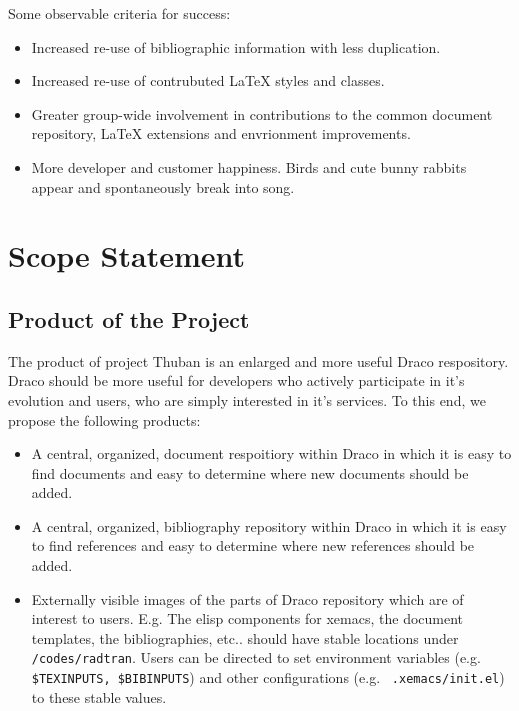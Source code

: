 \documentclass[11pt]{nmemo}
\begin{document}
Some observable criteria for success:

\begin{itemize}
\item Increased re-use of bibliographic information with less
  duplication.
\item Increased re-use of contrubuted LaTeX styles and classes.
\item Greater group-wide involvement in contributions to the common
  document repository, LaTeX extensions and envrionment improvements.
\item More developer and customer happiness. Birds and cute bunny
  rabbits appear and spontaneously break into song.
\end{itemize}

\section*{Scope Statement}


\subsection*{Product of the Project}

The product of project Thuban is an enlarged and more useful Draco
respository. Draco should be more useful for developers who actively
participate in it's evolution and users, who are simply interested in
it's services. To this end, we propose the following products:

\begin{itemize}
  \item A central, organized, document respoitiory within Draco in
    which it is easy to find documents and easy to determine where new
    documents should be added.
  \item A central, organized, bibliography repository within Draco in
    which it is easy to find references and easy to determine where
    new references should be added.
  \item Externally visible images of the parts of Draco repository
    which are of interest to users. E.g. The elisp components for
    xemacs, the document templates, the bibliographies, etc.. should
    have stable locations under {\tt /codes/radtran}. Users can be
    directed to set environment variables (e.g. {\tt \$TEXINPUTS,
      \$BIBINPUTS}) and other configurations (e.g. {\tt
      .xemacs/init.el}) to these stable values.
\end{itemize}
\end{document}
